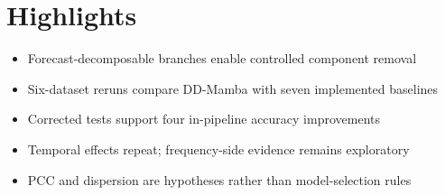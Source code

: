 \documentclass{article}
\begin{document}
\section*{Highlights}
\begin{itemize}
\item Forecast-decomposable branches enable controlled component removal
\item Six-dataset reruns compare DD-Mamba with seven implemented baselines
\item Corrected tests support four in-pipeline accuracy improvements
\item Temporal effects repeat; frequency-side evidence remains exploratory
\item PCC and dispersion are hypotheses rather than model-selection rules
\end{itemize}
\end{document}
